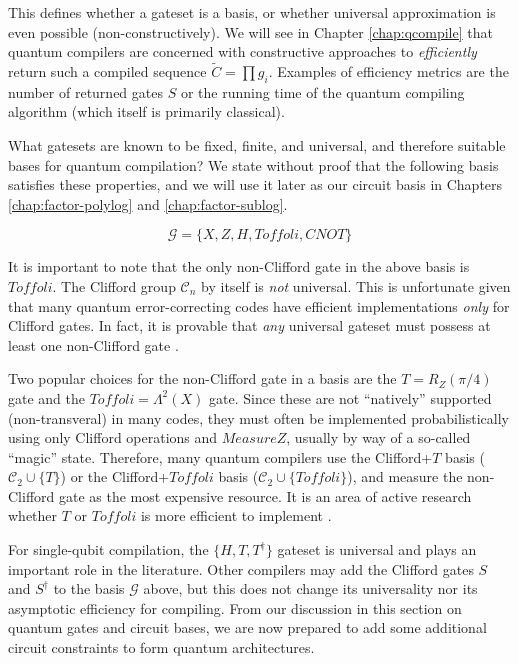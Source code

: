 This defines whether a gateset is a basis, or whether universal approximation
is even possible (non-constructively). We will see in
Chapter \ref{chap:qcompile} that
quantum compilers are concerned with constructive approaches to
\emph{efficiently} return such a compiled sequence $\tilde{C} = \prod g_i$.
Examples of efficiency metrics are the number of returned gates $S$ or
the running time of the quantum compiling algorithm (which itself is
primarily classical).

What gatesets are known to be fixed, finite, and universal, and therefore
suitable bases for quantum compilation? We state without proof that
the following basis satisfies these properties, and we will use it later as
our circuit basis in Chapters \ref{chap:factor-polylog} and
\ref{chap:factor-sublog}.

\begin{equation}
\mathcal{G} = \{X, Z, H, Toffoli, CNOT\}
\end{equation}

It is important to note that the only non-Clifford gate in the above basis
is $Toffoli$.
The Clifford group $\mathcal{C}_n$ by itself is \emph{not}
universal.
This is unfortunate given that many quantum error-correcting codes have
efficient implementations \emph{only} for Clifford gates. In fact, it is provable
that \emph{any} universal gateset must possess at least one
non-Clifford gate \cite{Zeng2011}.

Two popular choices for the non-Clifford gate in a basis are the $T = R_Z(\pi/4)$
gate and the $Toffoli = \Lambda^2(X)$ gate. Since these are not ``natively''
supported (non-transveral) in many codes, they must often be implemented
probabilistically using only Clifford operations and $MeasureZ$, usually
by way of a so-called ``magic'' state.
Therefore, many quantum compilers
use the Clifford+$T$ basis ($\mathcal{C}_2 \cup \{ T \}$)
or the Clifford+$Toffoli$ basis ($\mathcal{C}_2 \cup \{ Toffoli \}$),
and measure
the non-Clifford gate as the most expensive resource. It is an area of
active research
whether $T$ or $Toffoli$ is more efficient to implement
\cite{Jones2013a,Eastin2012}.

For single-qubit compilation, the $\{H,T, T^{\dagger}\}$ gateset is universal and
plays an important role in the literature. Other compilers may add
the Clifford gates $S$ and $S^{\dagger}$ to the basis $\mathcal{G}$ above,
but this does not change its universality nor its asymptotic efficiency for
compiling. From our discussion in this section
on quantum gates and circuit bases, we are now prepared to add some additional
circuit constraints to form quantum architectures.